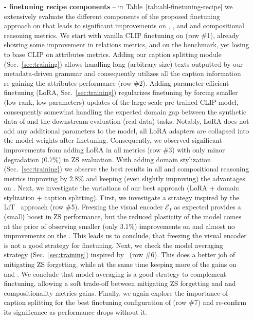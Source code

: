 \noindent\textbf{\ourdataset{} - finetuning recipe components} -- in Table~\ref{tab:abl-finetuning-recipe} we extensively evaluate the different components of the proposed finetuning approach on \ourdataset{} that leads to significant improvements on \vlchecklist{}, \ARO, and \winoground{} \vlc{} and compositional reasoning metrics. We start with vanilla CLIP finetuning on \ourdataset{} (row \#1), already showing some improvement in \vlchecklist{} relations metrics, and on the \ARO{} benchmark, yet losing to base CLIP on \vlchecklist{} attributes metrics. Adding our caption splitting module (Sec.~\ref{sec:training}) allows handling long (arbitrary size) texts outputted by our metadata-driven grammar and consequently utilizes all the caption information re-gaining the attributes performance (row \#2). Adding parameter-efficient finetuning (LoRA, Sec.~\ref{sec:training}) regularizes finetuning by forcing smaller (low-rank, low-parameters) updates of the large-scale pre-trained CLIP model, consequently somewhat handling the expected domain gap between the synthetic data of \ourdataset{} and the downstream evaluation (real data) tasks. Notably, LoRA does not add any additional parameters to the model, all LoRA adapters are collapsed into the model weights after finetuning. Consequently, we observed significant improvements from adding LoRA in all metrics (row \#3) with only minor degradation (0.7\%) in ZS evaluation. With adding domain stylization (Sec.~\ref{sec:training}) we observe the best results in all \vlc{} and compositional reasoning metrics improving \ARO{} by 2.8\% and keeping (even slightly improving) the advantages on \vlchecklist{}. Next, we investigate the variations of our best approach (LoRA + domain stylization + caption splitting). First, we investigate a strategy inspired by the LiT~\cite{lit} approach (row \#5). Freezing the visual encoder $\mathcal{E}_I$ as expected provides a (small) boost in ZS performance, but the reduced plasticity of the model comes at the price of observing smaller (only 3.1\%) improvements on \ARO{} and almost no improvements on the \vlchecklist{}. This leads us to conclude, that freezing the visual encoder is not a good strategy for \ourdataset{} finetuning. Next, we check the model averaging strategy (Sec.~\ref{sec:training}) inspired by~\cite{wortsman2022robust} (row \#6). This does a better job of mitigating ZS forgetting, while at the same time keeping more of the gains on \vlchecklist{} and \ARO{}. We conclude that model averaging is a good strategy to complement \ourdataset{} finetuning, allowing a soft trade-off between mitigating ZS forgetting and \vlc{} and compositionality metrics gains. Finally, we again explore the importance of caption splitting for the best finetuning configuration of \ourdataset{} (row \#7) and re-confirm its significance as performance drops without it.


